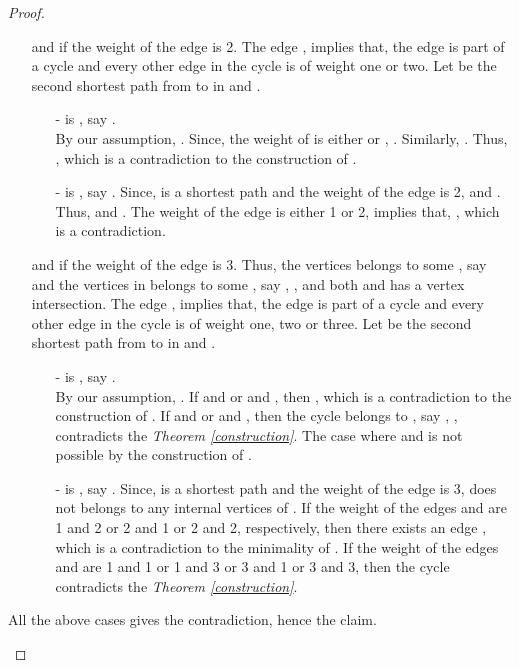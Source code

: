 \documentclass[runningheads]{llncs}
\begin{document}
\begin{proof}
\begin{description}
\begin{itemize}
\item[]  and if the weight of the edge  is 2. The edge , implies that, the edge  is part of a cycle and every other edge in the cycle is of weight one or two. Let  be the second shortest path from  to  in  and . 
\begin{itemize}
\item[-]  is , say . \\ By our assumption, . Since, the weight of  is either  or , . Similarly,  . Thus, , which is a contradiction to the construction of .
\item[-]  is , say . Since,  is a shortest path and the weight of the edge  is 2,  and . Thus,  and . The weight of the edge  is either 1 or 2, implies that, , which is a contradiction.
\end{itemize}


\item[]  and if the weight of the edge  is 3. Thus, the vertices  belongs to some , say  and the vertices in  belongs to some , say , , and both  and  has a vertex intersection. The edge , implies that, the edge  is part of a cycle and every other edge in the cycle is of weight one, two or three. Let  be the second shortest path from  to  in  and .

\begin{itemize}
\item[-]  is , say . \\ By our assumption, . If  and  or  and , then , which is a contradiction to the construction of . If  and  or  and , then the cycle belongs to , say , , contradicts the \emph{Theorem \ref{construction}}. The case where  and  is not possible by the construction of . 


\item[-]  is , say . Since,  is a shortest path and the weight of the edge  is 3,  does not belongs to any internal vertices of . If the weight of the edges  and  are 1 and 2 or 2 and 1 or 2 and 2, respectively, then there exists an edge , which is a contradiction to the minimality of . If the weight of the edges  and  are 1 and 1 or 1 and 3 or 3 and 1 or 3 and 3, then the cycle  contradicts the \emph{Theorem \ref{construction}}. 
\end{itemize}
\end{itemize}

All the above cases gives the contradiction, hence the claim. 

\end{description}
\end{proof}
\end{document}
